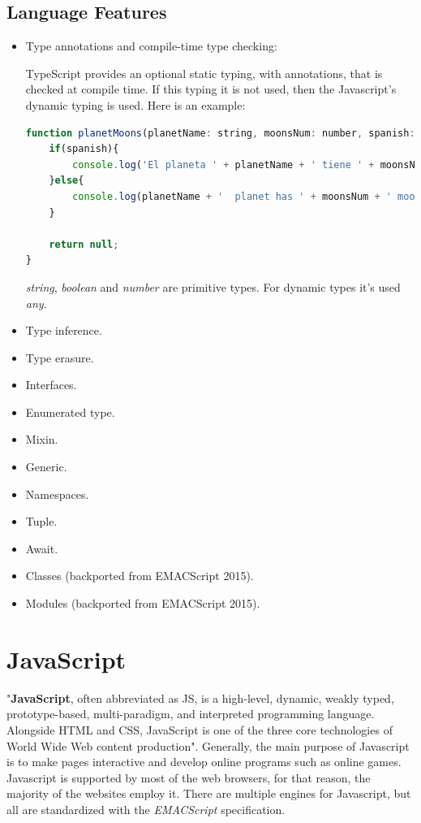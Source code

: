 \documentclass[a4paper, 12pt, english]{book}
\begin{document}
\subsection{Language Features}
\label{sec:typescript-features}

\begin{itemize}
    \item Type annotations and compile-time type checking:

        TypeScript provides an optional static typing, with annotations, that is checked at compile time. If this typing it is not used, then the Javascript's dynamic typing is used. Here is an example:

        \begin{lstlisting}[language=javascript]
function planetMoons(planetName: string, moonsNum: number, spanish: boolean): any {
	if(spanish){
	    console.log('El planeta ' + planetName + ' tiene ' + moonsNum + ' lunas');
	}else{
	    console.log(planetName + '  planet has ' + moonsNum + ' moons');
	}

	return null;
}
        \end{lstlisting}
        \textit{string}, \textit{boolean} and \textit{number} are primitive types. For dynamic types it's used \textit{any}.

    \item Type inference.
    \item Type erasure.
    \item Interfaces.
    \item Enumerated type.
    \item Mixin.
    \item Generic.
    \item Namespaces.
    \item Tuple.
    \item Await.
    \item Classes (backported from EMACScript 2015).
    \item Modules (backported from EMACScript 2015).

\end{itemize}


\section{JavaScript}
\label{sec:typeScript}

"\textbf{JavaScript}, often abbreviated as JS, is a high-level, dynamic, weakly typed, prototype-based, multi-paradigm, and interpreted programming language. Alongside HTML and CSS, JavaScript is one of the three core technologies of World Wide Web content production". Generally, the main purpose of Javascript is to make pages interactive and develop online programs such as online games. Javascript is supported by most of the web browsers, for that reason, the majority of the websites employ it. There are multiple engines for Javascript, but all are standardized with the \textit{EMACScript} specification.
\end{document}
